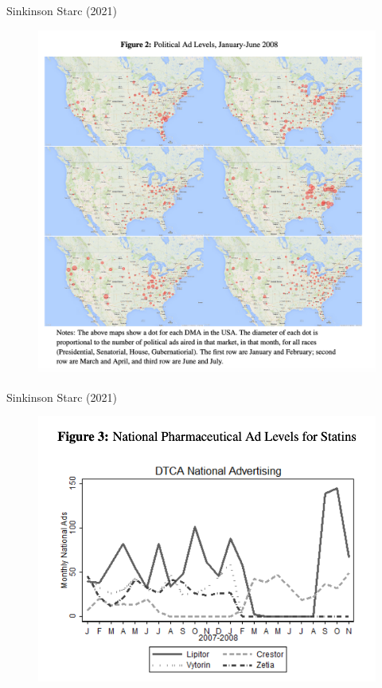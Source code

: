 \begin{frame}{Sinkinson Starc (2021)}
\begin{figure}
\centering
\includegraphics[height=\textheight]{./resources/ss_1.png}
\end{figure}
\end{frame}


\begin{frame}{Sinkinson Starc (2021)}
\begin{figure}
\centering
\includegraphics[height=\textheight]{./resources/ss_2.png}
\end{figure}
\end{frame}


